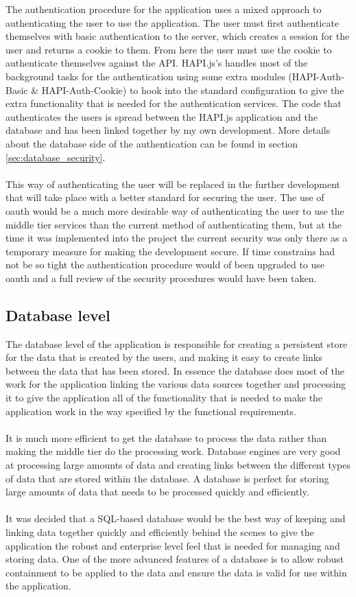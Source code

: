 The authentication procedure for the application uses a mixed approach to authenticating the user to use the application. The user must first authenticate themselves with basic authentication to the server, which creates a session for the user and returns a cookie to them. From here the user must use the cookie to authenticate themselves against the API. HAPI.js's handles most of the background tasks for the authentication using some extra modules (HAPI-Auth-Basic \& HAPI-Auth-Cookie) to hook into the standard configuration to give the extra functionality that is needed for the authentication services. The code that authenticates the users is spread between the HAPI.js application and the database and has been linked together by my own development. More details about the database side of the authentication can be found in section \ref{sec:database_security}.\\
\\
This way of authenticating the user will be replaced in the further development that will take place with a better standard for securing the user. The use of oauth would be a much more desirable way of authenticating the user to use the middle tier services than the current method of authenticating them, but at the time it was implemented into the project the current security was only there as a temporary measure for making the development secure. If time constrains had not be so tight the authentication procedure would of been upgraded to use oauth and a full review of the security procedures would have been taken.

\subsection{Database level}

The database level of the application is responsible for creating a persistent store for the data that is created by the users, and making it easy to create links between the data that has been stored. In essence the database does most of the work for the application linking the various data sources together and processing it to give the application all of the functionality that is needed to make the application work in the way specified by the functional requirements.\\
\\
It is much more efficient to get the database to process the data rather than making the middle tier do the processing work. Database engines are very good at processing large amounts of data and creating links between the different types of data that are stored within the database. A database is perfect for storing large amounts of data that needs to be processed quickly and efficiently.\\
\\
It was decided that a SQL-based database would be the best way of keeping and linking data together quickly and efficiently behind the scenes to give the application the robust and enterprise level feel that is needed for managing and storing data. One of the more advanced features of a database is to allow robust containment to be applied to the data and ensure the data is valid for use within the application.

